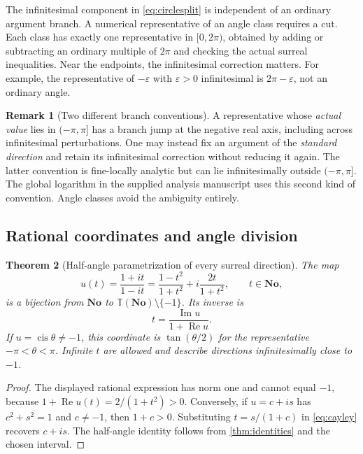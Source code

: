 \documentclass[11pt]{article}
\numberwithin{equation}{section}
\newtheorem{theorem}{Theorem}[section]
\theoremstyle{definition}
\newtheorem{remark}[theorem]{Remark}
\newcommand{\No}{\mathbf{No}}
\newcommand{\TT}{\mathbb T}
\newcommand{\eps}{\varepsilon}
\newcommand{\re}{\operatorname{Re}}
\newcommand{\im}{\operatorname{Im}}
\newcommand{\cis}{\operatorname{cis}}
\begin{document}
The infinitesimal component in \eqref{eq:circlesplit} is independent of an ordinary argument branch. A numerical representative of an angle class requires a cut. Each class has exactly one representative in $[0,2\pi)$, obtained by adding or subtracting an ordinary multiple of $2\pi$ and checking the actual surreal inequalities. Near the endpoints, the infinitesimal correction matters. For example, the representative of $-\eps$ with $\eps>0$ infinitesimal is $2\pi-\eps$, not an ordinary angle.

\begin{remark}[Two different branch conventions]
A representative whose \emph{actual value} lies in $(-\pi,\pi]$ has a branch jump at the negative real axis, including across infinitesimal perturbations. One may instead fix an argument of the \emph{standard direction} and retain its infinitesimal correction without reducing it again. The latter convention is fine-locally analytic but can lie infinitesimally outside $(-\pi,\pi]$. The global logarithm in the supplied analysis manuscript uses this second kind of convention. Angle classes avoid the ambiguity entirely.
\end{remark}

\subsection{Rational coordinates and angle division}
\begin{theorem}[Half-angle parametrization of every surreal direction]\label{thm:cayley}
The map
\begin{equation}\label{eq:cayley}
 u(t)=\frac{1+it}{1-it}
 =\frac{1-t^2}{1+t^2}+i\frac{2t}{1+t^2},\qquad t\in\No,
\end{equation}
is a bijection from $\No$ to $\TT(\No)\setminus\{-1\}$. Its inverse is
\[
 t=\frac{\im u}{1+\re u}.
\]
If $u=\cis\theta\ne-1$, this coordinate is $\tan(\theta/2)$ for the representative $-\pi<\theta<\pi$. Infinite $t$ are allowed and describe directions infinitesimally close to $-1$.
\end{theorem}
\begin{proof}
The displayed rational expression has norm one and cannot equal $-1$, because $1+\re u(t)=2/(1+t^2)>0$. Conversely, if $u=c+is$ has $c^2+s^2=1$ and $c\ne-1$, then $1+c>0$. Substituting $t=s/(1+c)$ in \eqref{eq:cayley} recovers $c+is$. The half-angle identity follows from \cref{thm:identities} and the chosen interval.
\end{proof}
\end{document}
